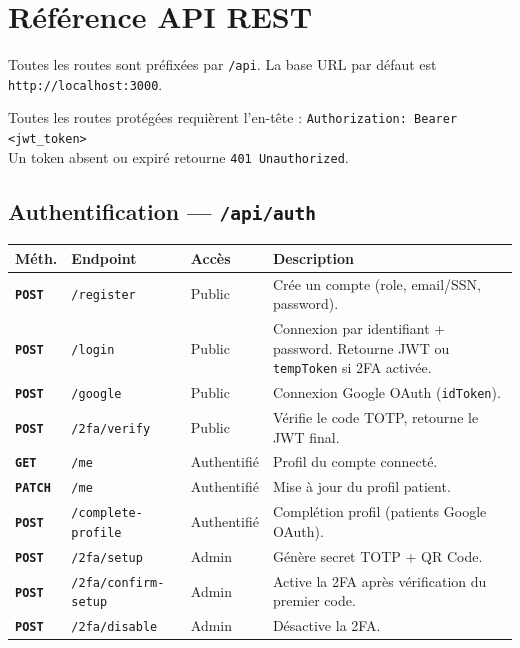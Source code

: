 \documentclass[12pt,a4paper]{report}
\newcommand{\method}[1]{\texttt{\textcolor{MedTealDark}{\bfseries#1}}}
\begin{document}
\chapter{Référence API REST}

Toutes les routes sont préfixées par \texttt{/api}. La base URL par défaut est \texttt{http://localhost:3000}.

\begin{infobox}[title=Convention d'authentification]
  Toutes les routes protégées requièrent l'en-tête :
  \texttt{Authorization: Bearer <jwt\_token>}\\
  Un token absent ou expiré retourne \texttt{401 Unauthorized}.
\end{infobox}

\section{Authentification — \texttt{/api/auth}}

\begin{center}
\small
\begin{tabular}{@{} l p{5.2cm} p{2.8cm} p{4.5cm} @{}}
  \toprule
  \textbf{Méth.} & \textbf{Endpoint} & \textbf{Accès} & \textbf{Description} \\
  \midrule
  \method{POST}  & \texttt{/register}         & Public       & Crée un compte (role, email/SSN, password). \\
  \method{POST}  & \texttt{/login}            & Public       & Connexion par identifiant + password. Retourne JWT ou \texttt{tempToken} si 2FA activée. \\
  \method{POST}  & \texttt{/google}           & Public       & Connexion Google OAuth (\texttt{idToken}). \\
  \method{POST}  & \texttt{/2fa/verify}       & Public       & Vérifie le code TOTP, retourne le JWT final. \\
  \method{GET}   & \texttt{/me}               & Authentifié  & Profil du compte connecté. \\
  \method{PATCH} & \texttt{/me}               & Authentifié  & Mise à jour du profil patient. \\
  \method{POST}  & \texttt{/complete-profile} & Authentifié  & Complétion profil (patients Google OAuth). \\
  \method{POST}  & \texttt{/2fa/setup}        & Admin        & Génère secret TOTP + QR Code. \\
  \method{POST}  & \texttt{/2fa/confirm-setup}& Admin        & Active la 2FA après vérification du premier code. \\
  \method{POST}  & \texttt{/2fa/disable}      & Admin        & Désactive la 2FA. \\
  \bottomrule
\end{tabular}
\end{center}
\end{document}
